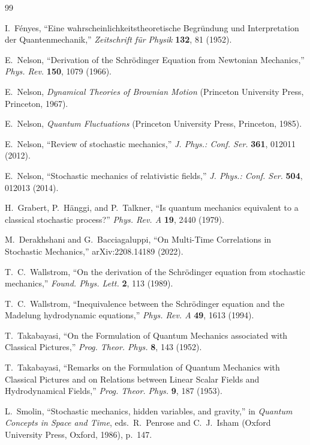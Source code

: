 \documentclass[11pt]{article}
\begin{document}
\begin{thebibliography}{99}

 I.~Fényes, ``Eine wahrscheinlichkeitstheoretische Begründung und Interpretation der Quantenmechanik,'' \emph{Zeitschrift für Physik} \textbf{132}, 81 (1952).

 E.~Nelson, ``Derivation of the Schrödinger Equation from Newtonian Mechanics,'' \emph{Phys. Rev.} \textbf{150}, 1079 (1966).

 E.~Nelson, \emph{Dynamical Theories of Brownian Motion} (Princeton University Press, Princeton, 1967).

 E.~Nelson, \emph{Quantum Fluctuations} (Princeton University Press, Princeton, 1985).

 E.~Nelson, ``Review of stochastic mechanics,'' \emph{J. Phys.: Conf. Ser.} \textbf{361}, 012011 (2012).

 E.~Nelson, ``Stochastic mechanics of relativistic fields,'' \emph{J. Phys.: Conf. Ser.} \textbf{504}, 012013 (2014).

 H.~Grabert, P.~Hänggi, and P.~Talkner, ``Is quantum mechanics equivalent to a classical stochastic process?'' \emph{Phys. Rev. A} \textbf{19}, 2440 (1979).

 M.~Derakhshani and G.~Bacciagaluppi, ``On Multi-Time Correlations in Stochastic Mechanics,'' arXiv:2208.14189 (2022).

 T.~C.~Wallstrom, ``On the derivation of the Schrödinger equation from stochastic mechanics,'' \emph{Found. Phys. Lett.} \textbf{2}, 113 (1989).

 T.~C.~Wallstrom, ``Inequivalence between the Schrödinger equation and the Madelung hydrodynamic equations,'' \emph{Phys. Rev. A} \textbf{49}, 1613 (1994).

 T.~Takabayasi, ``On the Formulation of Quantum Mechanics associated with Classical Pictures,'' \emph{Prog. Theor. Phys.} \textbf{8}, 143 (1952).

 T.~Takabayasi, ``Remarks on the Formulation of Quantum Mechanics with Classical Pictures and on Relations between Linear Scalar Fields and Hydrodynamical Fields,'' \emph{Prog. Theor. Phys.} \textbf{9}, 187 (1953).

 L.~Smolin, ``Stochastic mechanics, hidden variables, and gravity,'' in \emph{Quantum Concepts in Space and Time}, eds.\ R.~Penrose and C.~J.~Isham (Oxford University Press, Oxford, 1986), p.~147.


\end{thebibliography}
\end{document}

